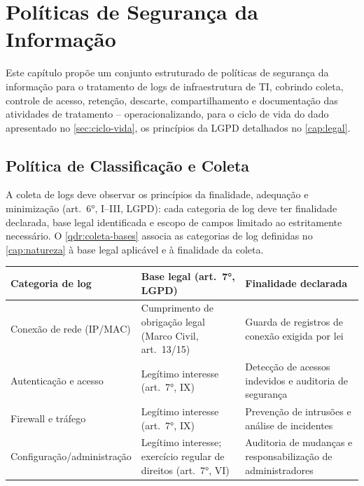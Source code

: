 
\chapter{Políticas de Segurança da Informação}
\label{cap:politicas}

Este capítulo propõe um conjunto estruturado de políticas de segurança da informação para o tratamento de logs de infraestrutura de TI, cobrindo coleta, controle de acesso, retenção, descarte, compartilhamento e documentação das atividades de tratamento -- operacionalizando, para o ciclo de vida do dado apresentado no \autoref{sec:ciclo-vida}, os princípios da LGPD detalhados no \autoref{cap:legal}.

\section{Política de Classificação e Coleta}
\label{sec:politica-coleta}

A coleta de logs deve observar os princípios da finalidade, adequação e minimização (art.\ 6°, I--III, LGPD): cada categoria de log deve ter finalidade declarada, base legal identificada e escopo de campos limitado ao estritamente necessário. O \autoref{qdr:coleta-bases} associa as categorias de log definidas no \autoref{cap:natureza} à base legal aplicável e à finalidade da coleta.

\begin{quadro}[htb]
    \caption{\label{qdr:coleta-bases}Categorias de log, base legal e finalidade da coleta}
    \begin{tabular}{|p{3cm}|p{4.2cm}|p{6.6cm}|}
        \hline
        \textbf{Categoria de log} & \textbf{Base legal (art.\ 7°, LGPD)} & \textbf{Finalidade declarada} \\
        \hline
        Conexão de rede (IP/MAC) & Cumprimento de obrigação legal (Marco Civil, art.\ 13/15) & Guarda de registros de conexão exigida por lei \\
        \hline
        Autenticação e acesso & Legítimo interesse (art.\ 7°, IX) & Detecção de acessos indevidos e auditoria de segurança \\
        \hline
        Firewall e tráfego & Legítimo interesse (art.\ 7°, IX) & Prevenção de intrusões e análise de incidentes \\
        \hline
        Configuração/administração & Legítimo interesse; exercício regular de direitos (art.\ 7°, VI) & Auditoria de mudanças e responsabilização de administradores \\
        \hline
    \end{tabular}
\end{quadro}

